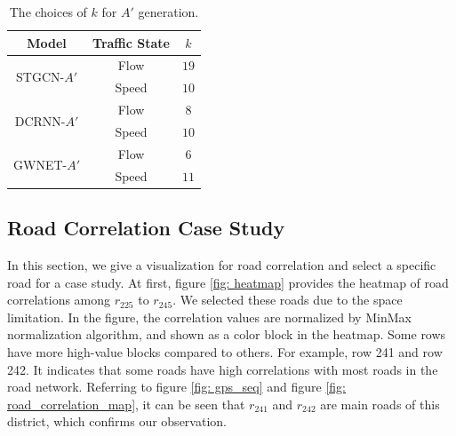 \begin{table}[htb]
    \renewcommand\arraystretch{1.5} %
    \begin{center}
        \caption{The choices of $k$ for $A'$ generation.}
        \label{k_table}
        \begin{tabular}{c|c|c}
            \toprule
  
            \textbf{Model} & \textbf{Traffic State} & \textbf{$k$}\\
  
            \hline
  
            \multirow{2}{*}{STGCN-$A'$} & Flow & $19$\\
            \cline{2-3}
            ~ & Speed & $10$\\

            \hline

            \multirow{2}{*}{DCRNN-$A'$} & Flow & $8$\\
            \cline{2-3}
            ~ & Speed & $10$\\

            \hline

            \multirow{2}{*}{GWNET-$A'$} & Flow & $6$\\
            \cline{2-3}
            ~ & Speed & $11$\\
  
            \bottomrule
        \end{tabular}
    \end{center}
\end{table}

\subsection{Road Correlation Case Study}
In this section, we give a visualization for road correlation and select a specific road for a case study. At first, figure \ref{fig: heatmap} provides the heatmap of road correlations among $r_{225}$ to $r_{245}$. We selected these roads due to the space limitation. In the figure, the correlation values are normalized by MinMax normalization algorithm, and shown as a color block in the heatmap. Some rows have more high-value blocks compared to others. For example, row 241 and row 242. It indicates that some roads have high correlations with most roads in the road network. Referring to figure \ref{fig: gps_seq} and figure \ref{fig: road_correlation_map}, it can be seen that $r_{241}$ and $r_{242}$ are main roads of this district, which confirms our observation.


